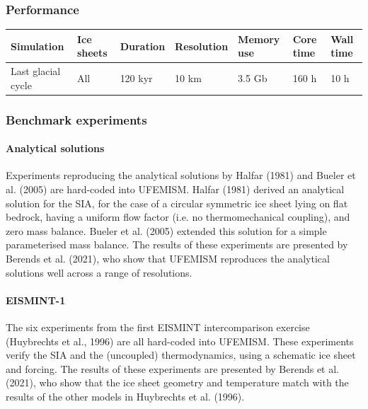 \documentclass{article}
\begin{document}
\subsubsection{Performance}

\begin{table}[H]
  \begin{center}
    \begin{tabular}{l|l|l|l|l|l|l}
      \textbf{Simulation} & \textbf{Ice sheets} & \textbf{Duration} & \textbf{Resolution} & \textbf{Memory use} & \textbf{Core time} & \textbf{Wall time}\\
      \hline
      Last glacial cycle & All & 120 kyr & 10 km & 3.5 Gb & 160 h & 10 h \\
    \end{tabular}
  \end{center}
\end{table}

\subsubsection{Benchmark experiments}

\paragraph{Analytical solutions}

Experiments reproducing the analytical solutions by Halfar (1981) and Bueler et al. (2005) are hard-coded into UFEMISM. Halfar (1981) derived an analytical solution for the SIA, for the case of a circular symmetric ice sheet lying on flat bedrock, having a uniform flow factor (i.e. no thermomechanical coupling), and zero mass balance. Bueler et al. (2005) extended this solution for a simple parameterised mass balance. The results of these experiments are presented by Berends et al. (2021), who show that UFEMISM reproduces the analytical solutions well across a range of resolutions.

\paragraph{EISMINT-1}

The six experiments from the first EISMINT intercomparison exercise (Huybrechts et al., 1996) are all hard-coded into UFEMISM. These experiments verify the SIA and the (uncoupled) thermodynamics, using a schematic ice sheet and forcing. The results of these experiments are presented by Berends et al. (2021), who show that the ice sheet geometry and temperature match with the results of the other models in Huybrechts et al. (1996).
\end{document}
